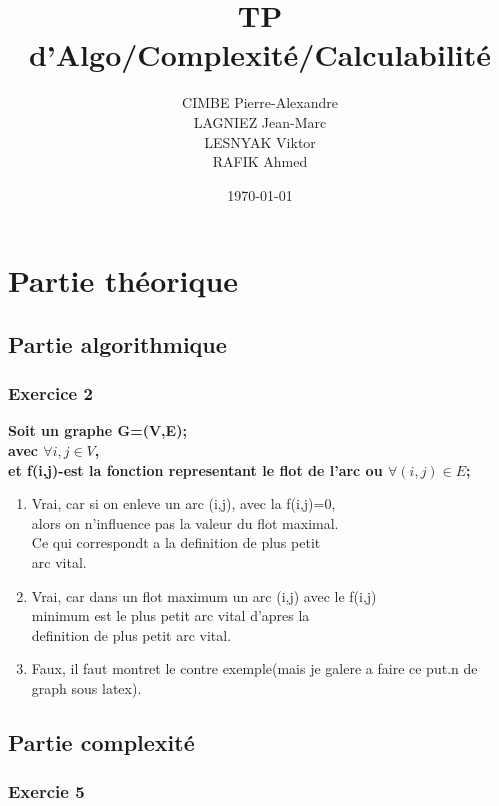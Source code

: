 \documentclass{article}
\title{TP d'Algo/Complexité/Calculabilité}
\author{
  CIMBE Pierre-Alexandre \\
  LAGNIEZ Jean-Marc \\
  LESNYAK Viktor \\
  RAFIK Ahmed}
\date\today
\begin{document}
\maketitle

\section{Partie théorique}
\subsection{Partie algorithmique}

\subsubsection{Exercice 2}

\textbf{Soit un graphe G=(V,E);\\
avec $\forall i,j \in V$,\\
et f(i,j)-est la fonction representant le flot de l'arc ou $\forall (i,j)\in E$;\\}

\begin{enumerate}


\item Vrai, car si on enleve un arc (i,j), avec la f(i,j)=0,\\ alors on n'influence pas la valeur du flot maximal.\\
Ce qui correspondt a la definition de plus petit \\arc vital.

\item Vrai, car dans un flot maximum un arc (i,j) avec le f(i,j)\\ minimum est le plus petit arc vital d'apres la \\
definition de plus petit arc vital.
\item Faux, il faut montret le contre exemple(mais je galere a faire ce put.n de graph sous latex).

 
\end{enumerate}


\subsection{Partie complexité}

\subsubsection{Exercie 5}
\end{document}
